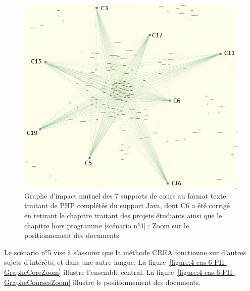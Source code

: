 \begin{figure}[htb!]
\centering
\centerline{  %
\includegraphics[scale=0.75]{4-Experiences/images/cas-final/6-Full-Text-noC+noP-PHP+Java_core-courses-written.png}
}
\caption{Graphe d'impact mutuel des 7 supports de cours au format texte traitant de PHP complétés du support Java, dont C6 a été corrigé en retirant le chapitre traitant des projets étudiants ainsi que le chapitre hors programme [scénario n°4] : Zoom sur le positionnement des documents}
\label{figure:4-cas-final-6-PII-GrapheCoreZoom}
\end{figure}

\hspace{0pt}
\vfill


\clearpage %
\newpage   %



Le scénario n°5 vise à s'assurer que la méthode CREA fonctionne sur d'autres sujets d'intérêts, et dans une autre langue.
La figure~\ref{figure:4-cas-6-PII-GrapheCoreZoom} illustre l'ensemble central.
La figure~\ref{figure:4-cas-6-PII-GrapheCoursesZoom} illustre le positionnement des documents.

\bigskip

